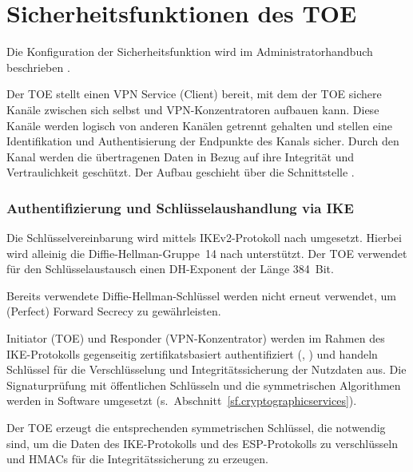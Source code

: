 \chapter{Sicherheitsfunktionen des TOE}\label{sf}



Die Konfiguration der Sicherheitsfunktion wird im Administratorhandbuch
beschrieben \autocite[Abschnitt~7.4.3.3 VPN (Virtual Private Network)]{agd_adm}.

\sfdescription{}

Der TOE stellt einen VPN Service (Client) bereit, mit dem der TOE sichere Kanäle
zwischen sich selbst und VPN-Konzentratoren aufbauen kann. Diese Kanäle werden
logisch von anderen Kanälen getrennt gehalten und stellen eine Identifikation
und Authentisierung der Endpunkte des Kanals sicher.  Durch den Kanal werden die
übertragenen Daten in Bezug auf ihre Integrität und Vertraulichkeit
geschützt. Der Aufbau geschieht über die Schnittstelle \lswan{}.
 
\subsection{Authentifizierung und Schlüsselaushandlung via IKE}\label{sf.vpn.ike}

Die Schlüsselvereinbarung wird mittels IKEv2-Protokoll nach  umgesetzt. 
Hierbei wird alleinig die Diffie-Hellman-Gruppe~14 nach  unterstützt. 
Der TOE verwendet für den Schlüsselaustausch einen DH-Exponent der Länge 384~Bit.

Bereits verwendete Diffie-Hellman-Schlüssel werden nicht erneut verwendet, 
um (Perfect) Forward Secrecy zu gewährleisten.

Initiator (TOE) und Responder (VPN-Konzentrator) werden im Rahmen des
IKE-Protokolls gegenseitig zertifikatsbasiert authentifiziert
(, ) und handeln Schlüssel für die
Verschlüsselung und Integritätssicherung der Nutzdaten aus.  Die Signaturprüfung
mit öffentlichen Schlüsseln und die symmetrischen Algorithmen werden in Software
umgesetzt (s.~Abschnitt~\vref{sf.cryptographicservices}).

Der TOE erzeugt die entsprechenden symmetrischen Schlüssel, die notwendig 
sind, um die Daten des IKE-Protokolls und des ESP-Protokolls zu verschlüsseln 
und HMACs für die Integritätssicherung zu erzeugen.

